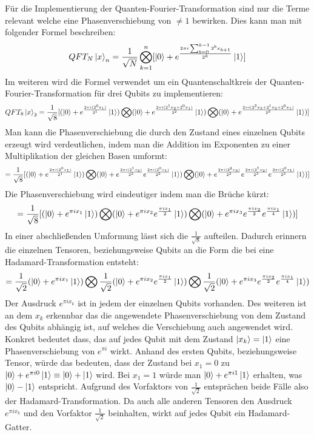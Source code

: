 Für die Implementierung der Quanten-Fourier-Transformation sind nur die Terme relevant
welche eine Phasenverschiebung von \(\neq 1\) bewirken.
Dies kann man mit folgender Formel beschreiben:
\[QFT_{N}\ket{x}_{n} = \frac{1}{\sqrt{N}}\bigotimes_{k=1}^n [  \ket{0} + { e^{\frac{2 \pi i \sum_{b=0}^{k-1}2^b x_{b+1} }{2^k}}}\ket{1}]\] 
Im weiteren wird die Formel verwendet um ein Quantenschaltkreis der Quanten-Fourier-Transformation für drei Qubits zu implementieren:
\[QFT_{8}\ket{x}_{3} = \frac{1}{\sqrt{8}} [ (\ket{0} + { e^{\frac{2 \pi i (2^0x_1)}{2^1}}}\ket{1} ) \bigotimes
( \ket{0} + { e^{\frac{2 \pi i (2^1x_2+2^0x_1)}{2^2}}}\ket{1} ) \bigotimes
( \ket{0} + { e^{\frac{2 \pi i (2^{2}x_3 +2^1x_2+2^0x_1)}{2^3}}}\ket{1} ) ] \]
Man kann die Phasenverschiebung die durch den Zustand eines einzelnen Qubits erzeugt wird verdeutlichen,
indem man die Addition im Exponenten zu einer Multiplikation der gleichen Basen umformt:
\[ = \frac{1}{\sqrt{8}} [ (\ket{0} + { e^{\frac{2 \pi i (2^0x_1)}{2^1}}}\ket{1}) \bigotimes
( \ket{0} + { e^{\frac{2 \pi i (2^1x_2)}{2^2}} e^{\frac{2 \pi i (2^0x_1)}{2^2}} }\ket{1} ) \bigotimes
( \ket{0} + { e^{\frac{2 \pi i (2^{2}x_3)}{2^3}} e^{\frac{2 \pi i (2^1x_2)}{2^3}} e^{\frac{2 \pi i (2^0x_1)}{2^3}}  }\ket{1} ) ] \]
Die Phasenverschiebung wird eindeutiger indem man die Brüche kürzt:
\[ = \frac{1}{\sqrt{8}} [ ( \ket{0} + e^{\pi i x_1}\ket{1} ) \bigotimes
( \ket{0} + { e^{\pi i x_2} e^{ \frac{ \pi i x_1}{2}} }\ket{1} ) \bigotimes
( \ket{0} + { e^{\pi i x_3} e^{\frac{\pi i x_2}{2}} e^{ \frac{ \pi i x_1}{4}} }\ket{1} ) ] \]
In einer abschließenden Umformung lässt sich die \(\frac{1}{\sqrt8}\) aufteilen.
Dadurch erinnern die einzelnen Tensoren,
beziehungsweise Qubits an die Form die bei eine Hadamard-Transformation entsteht:
\[ = \frac{1}{\sqrt{2}}( \ket{0} + e^{\pi i x_1}\ket{1} ) \bigotimes
\frac{1}{\sqrt{2}}( \ket{0} + { e^{\pi i x_2} e^{ \frac{ \pi i x_1}{2}} }\ket{1} ) \bigotimes
\frac{1}{\sqrt{2}}( \ket{0} + { e^{\pi i x_3} e^{\frac{\pi i x_2}{2}} e^{ \frac{ \pi i x_1}{4}} }\ket{1} )  \]
Der Ausdruck \(e^{\pi i x_k}\) ist in jedem der einzelnen Qubits vorhanden.
Des weiteren ist an dem \(x_k\) erkennbar das die angewendete Phasenverschiebung von dem Zustand des Qubits abhängig ist,
auf welches die Verschiebung auch angewendet wird.
Konkret bedeutet dass, das auf jedes Qubit mit dem Zustand \(\ket{x_k} = \ket{1}\) eine Phasenverschiebung von \(e^{\pi i}\) wirkt.
Anhand des ersten Qubits, beziehungsweise Tensor, würde das bedeuten, dass der Zustand bei \(x_1 = 0\)
zu \(\ket{0} + e^{\pi i 0} \ket{1} \equiv \ket{0} + \ket{1}\) wird.
Bei \(x_1 = 1\) würde man \(\ket{0} + e^{\pi i 1} \ket{1}\) erhalten,
was \(\ket{0} - \ket{1}\) entspricht.
Aufgrund des Vorfaktors von \(\frac{1}{\sqrt{2}}\) entsprächen beide Fälle also der Hadamard-Transformation.
Da auch alle anderen Tensoren den Ausdruck \(e^{\pi i x_k}\) und den Vorfaktor \(\frac{1}{\sqrt{2}}\) beinhalten, wirkt auf jedes Qubit ein Hadamard-Gatter.

